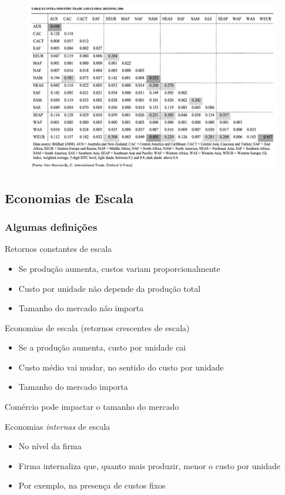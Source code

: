\documentclass[a4paper,12pt]{article}[abntex2]
\begin{document}
\begin{figure}[H]
    \centering
    \includegraphics[width=0.7\linewidth]{Imagens/a16i4.png}
\end{figure}

\subsection{\textbf{Economias de Escala}}
\subsubsection{\textbf{Algumas definições}}
Retornos constantes de escala
\begin{itemize}
    \item Se produção aumenta, custos variam proporcionalmente
    \item Custo por unidade não depende da produção total
    \item Tamanho do mercado não importa
\end{itemize}

Economias de escala (retornos crescentes de escala)
\begin{itemize}
    \item Se a produção aumenta, custo por unidade cai
    \item Custo médio vai mudar, no sentido do custo por unidade
    \item Tamanho do mercado importa
\end{itemize}

Comércio pode impactar o tamanho do mercado

Economias \textit{internas} de escala
\begin{itemize}
    \item No nível da firma
    \item Firma internaliza que, quanto mais produzir, menor o custo por unidade
    \item Por exemplo, na presença de custos fixos
\end{itemize}
\end{document}
